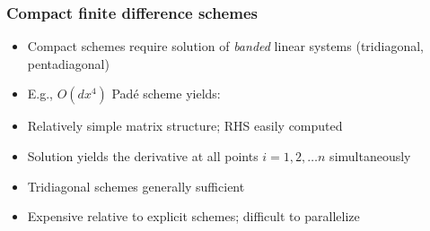\begin{frame}[t]
\frametitle{Compact finite difference schemes}
\footnotesize
\begin{itemize}
\item Compact schemes require solution of \emph{banded}
    linear systems (tridiagonal, pentadiagonal)
\item E.g., {$O(dx^4)$ Pad\'{e} scheme yields:
}
\item Relatively simple matrix structure; RHS easily computed
\item Solution yields the derivative at
    all points $i=1, 2, \hdots n$ simultaneously
\item Tridiagonal schemes generally sufficient
\item Expensive relative to explicit schemes; difficult to parallelize
\end{itemize}
\end{frame}

